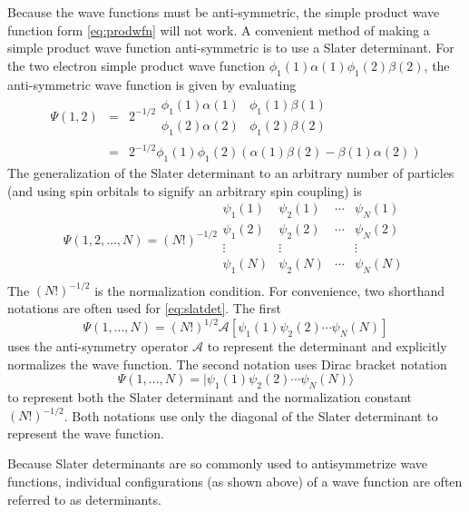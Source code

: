 Because the wave functions must be anti-symmetric, the simple product
wave function form \ref{eq:prodwfn} will not work. A convenient
method of making a simple product wave function
anti-symmetric is to use a Slater determinant. For the
two electron simple product wave function
$\phi_1(1)\alpha(1)\phi_1(2)\beta(2)$, the anti-symmetric wave
function is given by evaluating  
\begin{eqnarray}
  \Psi(1,2) &=& 2^{-1/2} \begin{array}{|cc|}
		\phi_1(1)\alpha(1) & \phi_1(1) \beta(1) \\
		\phi_1(2)\alpha(2) & \phi_1(2) \beta(2) 
	\end{array} \\
     &=& 2^{-1/2}\phi_1(1)\phi_1(2)(\alpha(1)\beta(2) - 
		\beta(1)\alpha(2))
\end{eqnarray}
The generalization of the Slater determinant to an arbitrary
number of particles (and using spin orbitals to signify an arbitrary
spin coupling) is 
\begin{equation}
  \Psi(1,2,\dots,N) = (N!)^{-1/2} \begin{array}{|cccc|}
	\psi_1(1) & \psi_2(1) & \cdots & \psi_N(1) \\
	\psi_1(2) & \psi_2(2) & \cdots & \psi_N(2) \\
        \vdots    & \vdots &   & \vdots \\
	\psi_1(N) & \psi_2(N) & \cdots & \psi_N(N) \\
	\end{array}
\label{eq:slatdet}
\end{equation}
The $(N!)^{-1/2}$ is the normalization condition. For
convenience, two shorthand notations are often used for
\ref{eq:slatdet}. The first
\begin{equation}
	\Psi(1,\dots,N) = (N!)^{1/2}\mathcal{A}
	\left[\psi_1(1)\psi_2(2)\cdots\psi_N(N)\right]
\end{equation}
uses the anti-symmetry operator $\mathcal{A}$ to represent
the determinant and explicitly normalizes the wave function. The
second notation uses Dirac bracket notation
\begin{equation}
  \Psi(1,\dots,N) = |\psi_1(1)\psi_2(2)\cdots \psi_N(N)\rangle
\end{equation}
to represent both the Slater determinant and the
normalization constant $(N!)^{-1/2}$. Both notations use only the
diagonal of the Slater determinant to represent the wave function.

Because Slater determinants are so commonly used to antisymmetrize
wave functions, individual configurations (as shown above) of a wave
function are often referred to as determinants. 

